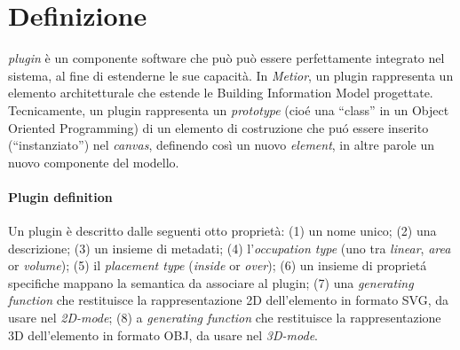 \section{Definizione}
\label{sec:chapter_3_section_1}

\emph{plugin} \`e un componente software che pu\`o può essere perfettamente integrato nel sistema, al fine di estenderne le sue capacit\`a.
In \emph{Metior}, un plugin rappresenta un elemento architetturale che estende le Building Information Model progettate.
Tecnicamente, un plugin rappresenta un \emph{prototype} (cio\'e una ``class'' in un Object Oriented Programming) di un elemento di
costruzione che pu\'o essere inserito (``instanziato'') nel \emph{canvas}, definendo cos\`i un nuovo \emph{element}, in altre parole
un nuovo componente del modello.


\paragraph{Plugin definition}

\noindent
Un plugin \`e descritto dalle seguenti otto propriet\`a: (1) un nome unico; (2) una descrizione; (3) un insieme di metadati;
(4) l'\emph{occupation type} (uno tra \emph{linear}, \emph{area} or \emph{volume}); (5) il \emph{placement type} (\emph{inside} or \emph{over});
(6) un insieme di propriet\'a specifiche mappano la semantica da associare al plugin;
(7) una \emph{generating function} che restituisce la rappresentazione 2D dell'elemento in formato SVG, da usare nel \emph{2D-mode};
(8) a \emph{generating function} che restituisce la rappresentazione 3D dell'elemento in formato OBJ, da usare nel  \emph{3D-mode}.

